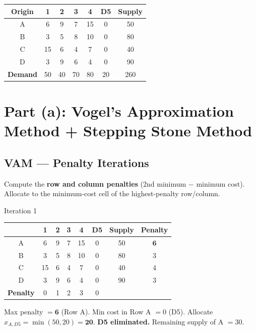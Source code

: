 \documentclass[12pt]{article}
\begin{document}
\begin{center}
\renewcommand{\arraystretch}{1.3}
\begin{tabular}{|c|c|c|c|c|c|c|}
  \hline
  \rowcolor{primary}
  {\color{white}\textbf{Origin}} &
  {\color{white}\textbf{1}} &
  {\color{white}\textbf{2}} &
  {\color{white}\textbf{3}} &
  {\color{white}\textbf{4}} &
  {\color{white}\textbf{D5}} &
  {\color{white}\textbf{Supply}} \\
  \hline
  \rowcolor{lightbg!50} A & 6 & 9 & 7 & 15 & 0 & 50 \\
  \hline
  B & 3 & 5 & 8 & 10 & 0 & 80 \\
  \hline
  \rowcolor{lightbg!50} C & 15 & 6 & 4 & 7 & 0 & 40 \\
  \hline
  D & 3 & 9 & 6 & 4 & 0 & 90 \\
  \hline
  \rowcolor{accent!20}
  \textbf{Demand} & 50 & 40 & 70 & 80 & 20 & 260 \\
  \hline
\end{tabular}
\end{center}

\section{Part (a): Vogel's Approximation Method + Stepping Stone Method}

\subsection*{VAM --- Penalty Iterations}

Compute the \textbf{row and column penalties} (2nd minimum $-$ minimum cost). Allocate to the minimum-cost cell of the highest-penalty row/column.

\vspace{6pt}

\begin{iterbox}{Iteration 1}
\begin{center}
\renewcommand{\arraystretch}{1.25}
\begin{tabular}{|c|c|c|c|c|c|c|c|}
  \hline
  \rowcolor{primary}
  & {\color{white}\textbf{1}} & {\color{white}\textbf{2}} &
    {\color{white}\textbf{3}} & {\color{white}\textbf{4}} &
    {\color{white}\textbf{D5}} & {\color{white}\textbf{Supply}} & {\color{white}\textbf{Penalty}} \\
  \hline
  \rowcolor{gold!25} A & 6 & 9 & 7 & 15 & 0 & 50 & $\mathbf{6}$ \\
  \hline
  B & 3 & 5 & 8 & 10 & 0 & 80 & 3 \\
  \hline
  C & 15 & 6 & 4 & 7 & 0 & 40 & 4 \\
  \hline
  D & 3 & 9 & 6 & 4 & 0 & 90 & 3 \\
  \hline
  \rowcolor{accent!15}
  \textbf{Penalty} & 0 & 1 & 2 & 3 & 0 & & \\
  \hline
\end{tabular}
\end{center}
Max penalty $= \mathbf{6}$ (Row A). Min cost in Row A $= 0$ (D5).
Allocate $x_{A,D5} = \min(50,20) = \mathbf{20}$. \textbf{D5 eliminated.} Remaining supply of A $= 30$.
\end{iterbox}
\end{document}
